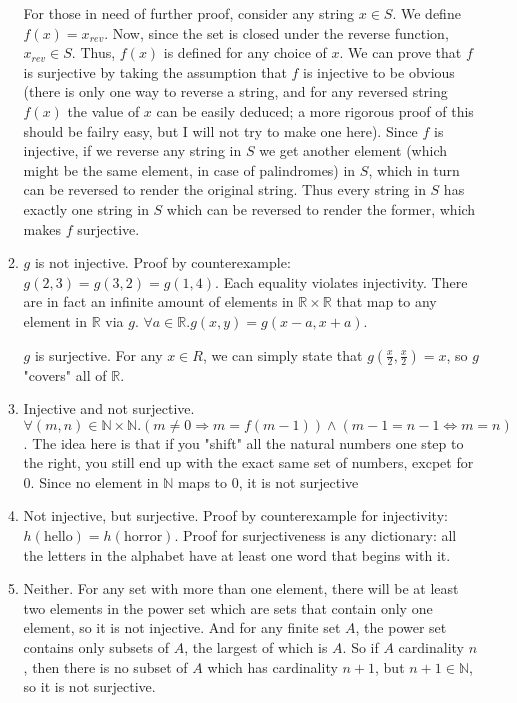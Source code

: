 \documentclass{article}
\begin{document}
\begin{enumerate}
\begin{enumerate}
                For those in need of further proof, consider any string $x \in S$. We define $f(x) = x_{rev}$. Now, since the set is closed under the reverse function, $x_{rev} \in S$. Thus, $f(x)$ is defined for any choice of $x$. We can prove that $f$ is surjective by taking the assumption that $f$ is injective to be obvious (there is only one way to reverse a string, and for any reversed string $f(x)$ the value of $x$ can be easily deduced; a more rigorous proof of this should be failry easy, but I will not try to make one here). Since $f$ is injective, if we reverse any string in $S$ we get another element (which might be the same element, in case of palindromes) in $S$, which in turn can be reversed to render the original string. Thus every string in $S$ has exactly one string in $S$ which can be reversed to render the former, which makes $f$ surjective.
            \item
                $g$ is not injective. Proof by counterexample: $g(2,3) = g(3,2) = g(1,4)$. Each equality violates injectivity. There are in fact an infinite amount of elements in $\mathbb{R} \times \mathbb{R}$ that map to any element in $\mathbb{R}$ via $g$. $\forall a \in \mathbb{R} . g(x,y) = g(x-a, x+a)$.

                $g$ is surjective. For any $x \in R$, we can simply state that $g(\frac{x}{2}, \frac{x}{2}) = x$, so $g$ "covers" all of $\mathbb{R}$.
            \item
                Injective and not surjective. $\forall (m, n) \in \mathbb{N}  \times \mathbb{N} . (m \neq 0 \Rightarrow m = f(m-1)) \land (m - 1 = n - 1 \Leftrightarrow m = n)$. The idea here is that if you "shift" all the natural numbers one step to the right, you still end up with the exact same set of numbers, excpet for 0. Since no element in $\mathbb{N}$ maps to 0, it is not surjective

            \item
                Not injective, but surjective. Proof by counterexample for injectivity: $h(\text{hello}) = h(\text{horror})$. Proof for surjectiveness is any dictionary: all the letters in the alphabet have at least one word that begins with it.

            \item
                Neither. For any set with more than one element, there will be at least two elements in the power set which are sets that contain only one element, so it is not injective. And for any finite set $A$, the power set contains only subsets of $A$, the largest of which is $A$. So if $A$ cardinality $n$, then there is no subset of $A$ which has cardinality $n + 1$, but $n + 1 \in \mathbb{N}$, so it is not surjective.
        \end{enumerate}


\end{enumerate}
\end{document}

